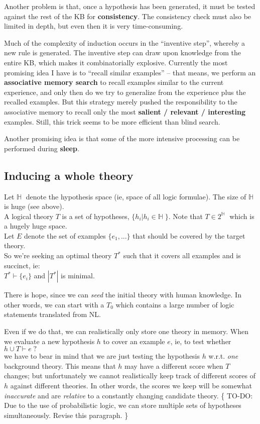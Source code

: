 Another problem is that, once a hypothesis has been generated, it must be tested against the rest of the KB for \textbf{consistency}.  The consistency check must also be limited in depth, but even then it is very time-consuming.

Much of the complexity of induction occurs in the ``inventive step'', whereby a new rule is generated.  The inventive step can draw upon knowledge from the entire KB, which makes it combinatorially explosive.  Currently the most promising idea I have is to ``recall similar examples'' -- that means, we perform an \textbf{associative memory search} to recall examples similar to the current experience, and only then do we try to generalize from the experience plus the recalled examples.  But this strategy merely pushed the responsibility to the associative memory to recall only the most \textbf{salient / relevant / interesting} examples.  Still, this trick seems to be more efficient than blind search.

Another promising idea is that some of the more intensive processing can be performed during \textbf{sleep}.

\subsection{Inducing a whole theory}

Let $\mathbb{H} \;$  denote the hypothesis space (ie, space of all logic formulae).  The size of $\mathbb{H} \;$ is huge (see above).\\
A logical theory $T$ is a set of hypotheses, $ \{ h_i | h_i \in \mathbb{H} \; \} $.  Note that $ T \in 2^{\mathbb{H}} \;$ which is a hugely huge space.\\
Let $E$ denote the set of examples $\{ e_1, ... \}$ that should be covered by the target theory.\\
So we're seeking an optimal theory $T^*$ such that it covers all examples and is succinct, ie:\\
\hspace*{1cm} $ T^* \vdash \{ e_i \} $ \quad and \quad $ |T^*| $ is minimal.

There is hope, since we can \textit{seed} the initial theory with human knowledge.  In other words, we can start with a $T_0$ which contains a large number of logic statements translated from NL.

Even if we do that, we can realistically only store one theory in memory.  When we evaluate a new hypothesis $h$ to cover an example $e$, ie, to test whether\\
\hspace*{1cm} $h \cup T \vdash e \; ?$\\
we have to bear in mind that we are just testing the hypothesis $h$ w.r.t. \textit{one} background theory.  This means that $h$ may have a different score when $T$ changes;  but unfortunately we cannot realistically keep track of different scores of $h$ against different theories.  In other words, the scores we keep will be somewhat \textit{inaccurate} and are \textit{relative} to a constantly changing candidate theory.  \{ TO-DO:  Due to the use of probabilistic logic, we can store multiple sets of hypotheses simultaneously.  Revise this paragraph. \}


